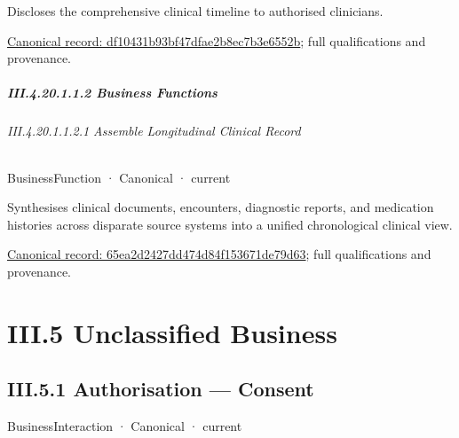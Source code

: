 Discloses the comprehensive clinical timeline to authorised clinicians.


{\footnotesize \href{../../../../../../../../continuum/business/business-service/df10431b93bf47dfae2b8ec7b3e6552b.md}{Canonical record: df10431b93bf47dfae2b8ec7b3e6552b}; full qualifications and provenance.}\par
\paragraph*{III.4.20.1.1.2 Business Functions}
\label{navigation:III.4.20.1.1.2}

\subparagraph*{III.4.20.1.1.2.1 Assemble Longitudinal Clinical Record}
\label{navigation:III.4.20.1.1.2.1}

\label{element:65ea2d2427dd474d84f153671de79d63}
{\small BusinessFunction · Canonical · current}\par

Synthesises clinical documents, encounters, diagnostic reports, and medication histories across disparate source systems into a unified chronological clinical view.


{\footnotesize \href{../../../../../../../../continuum/business/business-function/65ea2d2427dd474d84f153671de79d63.md}{Canonical record: 65ea2d2427dd474d84f153671de79d63}; full qualifications and provenance.}\par
\chapter*{III.5 Unclassified Business}
\label{navigation:III.5}

\section*{III.5.1 Authorisation — Consent}
\label{navigation:III.5.1}

\label{element:8c8a371f6a324d908656c3c935c7656f}
{\small BusinessInteraction · Canonical · current}\par

